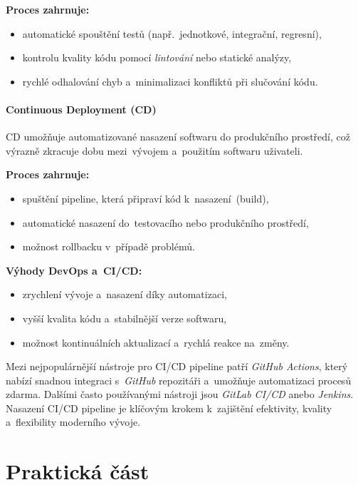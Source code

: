 \documentclass[male,czech,api_bc]{kitheses}
\begin{document}
\textbf{Proces zahrnuje:}
\begin{itemize}
	\item automatické spouštění testů (např.~jednotkové, integrační, regresní),
	\item kontrolu kvality kódu pomocí \textit{lintování} nebo statické analýzy,
	\item rychlé odhalování chyb a~minimalizaci konfliktů při slučování kódu.
\end{itemize}

\subsubsection{Continuous Deployment (CD)}

CD umožňuje automatizované nasazení softwaru do produkčního prostředí, což výrazně zkracuje dobu mezi~vývojem a~použitím softwaru uživateli.

\textbf{Proces zahrnuje:}
\begin{itemize}
	\item spuštění pipeline, která připraví kód k~nasazení~(build),
	\item automatické nasazení do~testovacího nebo produkčního prostředí,
	\item možnost rollbacku v~případě problémů.
\end{itemize}

\textbf{Výhody DevOps a~CI/CD:}
\begin{itemize}
	\item zrychlení vývoje a~nasazení díky automatizaci,
	\item vyšší kvalita kódu a~stabilnější verze softwaru,
	\item možnost kontinuálních aktualizací a~rychlá reakce na~změny.
\end{itemize}

Mezi nejpopulárnější nástroje pro CI/CD pipeline patří \textit{GitHub Actions}, který nabízí snadnou integraci s~\textit{GitHub} repozitáři a~umožňuje automatizaci procesů zdarma. Dalšími často používanými nástroji jsou \textit{GitLab CI/CD} anebo \textit{Jenkins}. Nasazení CI/CD pipeline je klíčovým krokem k~zajištění efektivity, kvality a~flexibility moderního vývoje.

\chapter{Praktická část}
\end{document}
